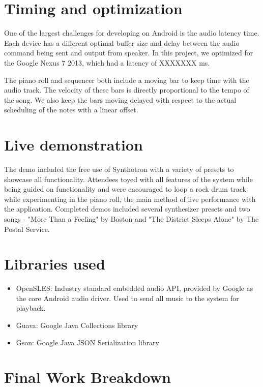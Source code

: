\documentclass[letterpaper,12pt]{article}
\begin{document}
\section{Timing and optimization}
One of the largest challenges for developing on Android is the audio latency time. Each device has a different optimal buffer size and delay between the audio command being sent and output from speaker. In this project, we optimized for the Google Nexus 7 2013, which had a latency of XXXXXXX ms.

The piano roll and sequencer both include a moving bar to keep time with the audio track. The velocity of these bars is directly proportional to the tempo of the song. We also keep the bars moving delayed with respect to the actual scheduling of the notes with a linear offset.

\section{Live demonstration}
The demo included the free use of Synthotron with a variety of presets to showcase all functionality. Attendees toyed with all features of the system while being guided on functionality and were encouraged to loop a rock drum track while experimenting in the piano roll, the main method of live performance with the application. Completed demos included several synthesizer presets and two songs - "More Than a Feeling" by Boston and "The District Sleeps Alone" by The Postal Service.

\section{Libraries used}
\begin{itemize}
    \item OpenSLES: Industry standard embedded audio API, provided by Google as the core Android audio driver. Used to send all music to the system for playback. \cite{opensles}
    \item Guava: Google Java Collections library \cite{guava}
    \item Gson: Google Java JSON Serialization library \cite{gson}
\end{itemize}



\clearpage
\section*{Final Work Breakdown}
\end{document}
